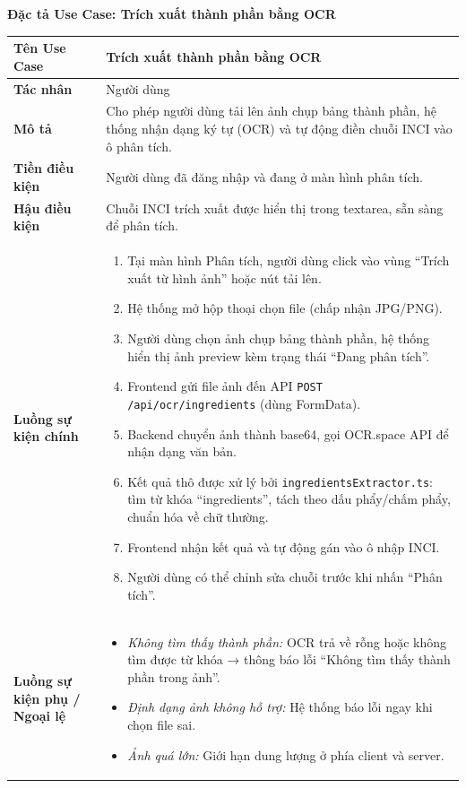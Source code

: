 \documentclass[12pt,a4paper]{article}
\begin{document}
\vspace{0.5cm}
\textbf{Đặc tả Use Case: Trích xuất thành phần bằng OCR}

\begin{center}
\renewcommand{\arraystretch}{1.4}
\begin{tabular}{|p{4cm}|p{10cm}|}
\hline
\rowcolor{blue!15}
\textbf{Tên Use Case} & \textbf{Trích xuất thành phần bằng OCR} \\ \hline
\textbf{Tác nhân} & Người dùng \\ \hline
\textbf{Mô tả} & Cho phép người dùng tải lên ảnh chụp bảng thành phần, hệ thống nhận dạng ký tự (OCR) và tự động điền chuỗi INCI vào ô phân tích. \\ \hline
\textbf{Tiền điều kiện} & Người dùng đã đăng nhập và đang ở màn hình phân tích. \\ \hline
\textbf{Hậu điều kiện} & Chuỗi INCI trích xuất được hiển thị trong textarea, sẵn sàng để phân tích. \\ \hline
\textbf{Luồng sự kiện chính} & 
\begin{enumerate}
    \item Tại màn hình Phân tích, người dùng click vào vùng “Trích xuất từ hình ảnh” hoặc nút tải lên.
    \item Hệ thống mở hộp thoại chọn file (chấp nhận JPG/PNG).
    \item Người dùng chọn ảnh chụp bảng thành phần, hệ thống hiển thị ảnh preview kèm trạng thái “Đang phân tích”.
    \item Frontend gửi file ảnh đến API \texttt{POST /api/ocr/ingredients} (dùng FormData).
    \item Backend chuyển ảnh thành base64, gọi OCR.space API để nhận dạng văn bản.
    \item Kết quả thô được xử lý bởi \texttt{ingredientsExtractor.ts}: tìm từ khóa “ingredients”, tách theo dấu phẩy/chấm phẩy, chuẩn hóa về chữ thường.
    \item Frontend nhận kết quả và tự động gán vào ô nhập INCI.
    \item Người dùng có thể chỉnh sửa chuỗi trước khi nhấn “Phân tích”.
\end{enumerate} \\ \hline
\textbf{Luồng sự kiện phụ / Ngoại lệ} & 
\begin{itemize}
    \item \textit{Không tìm thấy thành phần:} OCR trả về rỗng hoặc không tìm được từ khóa → thông báo lỗi “Không tìm thấy thành phần trong ảnh”.
    \item \textit{Định dạng ảnh không hỗ trợ:} Hệ thống báo lỗi ngay khi chọn file sai.
    \item \textit{Ảnh quá lớn:} Giới hạn dung lượng ở phía client và server.
\end{itemize} \\ \hline
\end{tabular}
\end{center}
\end{document}
